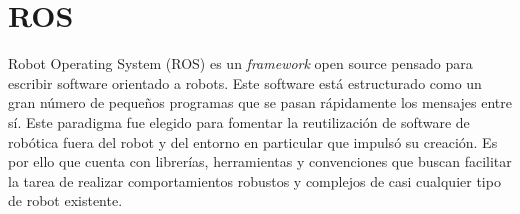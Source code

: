 \section{ROS}

Robot Operating System (ROS) es un \textit{framework} open source pensado para escribir software orientado a robots. Este software está estructurado como un gran número de pequeños programas que se pasan rápidamente los mensajes entre sí. Este paradigma fue elegido para fomentar la reutilización de software de robótica fuera del robot y del entorno en particular que impulsó su creación. Es por ello que cuenta con librerías, herramientas y convenciones que buscan facilitar la tarea de realizar comportamientos robustos y complejos de casi cualquier tipo de robot existente.